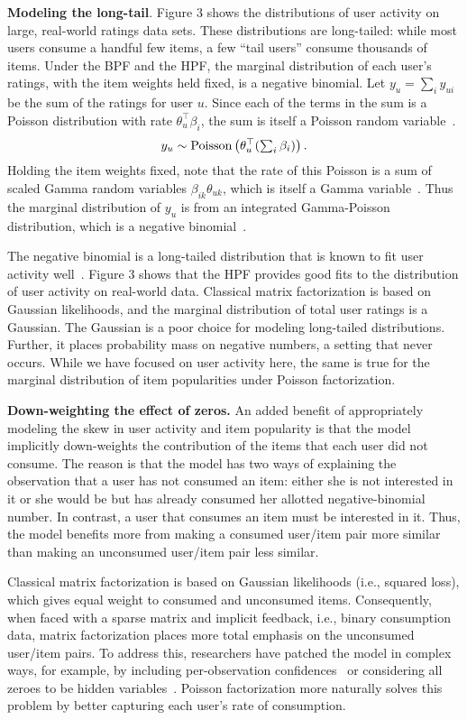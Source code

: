 {\bf Modeling the long-tail}.
Figure 3 shows the distributions of user activity on large, real-world
ratings data sets. These distributions are long-tailed: while most
users consume a handful few items, a few ``tail users'' consume
thousands of items. Under the BPF and the HPF, the marginal
distribution of each user's ratings, with the item weights held fixed,
is a negative binomial.  Let $y_{u} = \sum_{i} y_{ui}$ be the sum of
the ratings for user $u$.  Since each of the terms in the sum is a
Poisson distribution with rate $\theta_u^\top \beta_i$, the sum is
itself a Poisson random variable~\cite{Johnson:2005}.
\begin{equation}
  y_u \sim \textrm{Poisson}\left(\theta_u^\top (\textstyle \sum_{i} \beta_{i})\right).
\end{equation}
Holding the item weights fixed, note that the rate of this Poisson is
a sum of scaled Gamma random variables $\beta_{ik} \theta_{uk}$, which
is itself a Gamma variable~\cite{Norman:1994}.  Thus the marginal
distribution of $y_u$ is from an integrated Gamma-Poisson
distribution, which is a negative binomial~\cite{Gelman:1995}.

The negative binomial is a long-tailed distribution that is known to
fit user activity well~\cite{Goodhardt:1984,Dunning:1993}.  Figure 3
shows that the HPF provides good fits to the distribution of user
activity on real-world data.  Classical matrix factorization is based
on Gaussian likelihoods, and the marginal distribution of total user
ratings is a Gaussian.  The Gaussian is a poor choice for modeling
long-tailed distributions. Further, it places probability mass on
negative numbers, a setting that never occurs. While we have focused
on user activity here, the same is true for the marginal distribution
of item popularities under Poisson factorization.

{\bf Down-weighting the effect of zeros.}
An added benefit of appropriately modeling the skew in user activity
and item popularity is that the model implicitly down-weights the
contribution of the items that each user did not consume. The reason
is that the model has two ways of explaining the observation that a
user has not consumed an item: either she is not interested in it or
she would be but has already consumed her allotted negative-binomial
number.  In contrast, a user that consumes an item must be interested
in it.  Thus, the model benefits more from making a consumed user/item
pair more similar than making an unconsumed user/item pair less
similar.

Classical matrix factorization is based on Gaussian likelihoods (i.e.,
squared loss), which gives equal weight to consumed and unconsumed
items.  Consequently, when faced with a sparse matrix and implicit
feedback, i.e., binary consumption data, matrix factorization places
more total emphasis on the unconsumed user/item pairs.  To address
this, researchers have patched the model in complex ways, for example,
by including per-observation confidences~\cite{Koren:2009} or
considering all zeroes to be hidden variables~\cite{Paquet:2013p9197}.
Poisson factorization more naturally solves this problem by better
capturing each user's rate of consumption.

